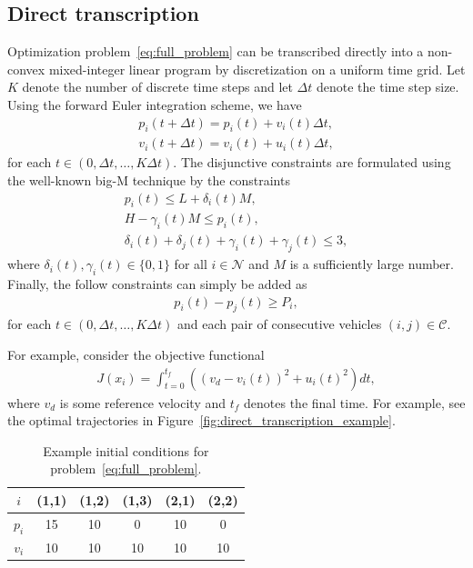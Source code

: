 \documentclass[a4paper]{article}
\theoremstyle{definition}
\theoremstyle{plain}
\begin{document}
\subsection*{Direct transcription}

Optimization problem~\eqref{eq:full_problem} can be transcribed directly into a
non-convex mixed-integer linear program by discretization on a uniform time
grid. Let $K$ denote the number of discrete time steps and let $\Delta t$ denote
the time step size.
%
Using the forward Euler integration scheme, we have
\begin{subequations}
\begin{align*}
  p_{i}(t + \Delta t) = p_{i}(t) + v_{i}(t) \Delta t , \\
  v_{i}(t + \Delta t) = v_{i}(t) + u_{i}(t) \Delta t ,
\end{align*}
\end{subequations}
for each $t \in (0, \Delta t, \dots, K \Delta t)$. The disjunctive constraints are formulated
using the well-known big-M technique by the constraints
\begin{subequations}
\begin{align*}
  p_{i}(t) \leq L + \delta_{i}(t) M , \\
  H - \gamma_{i}(t) M \leq p_{i}(t) , \\
  \delta_{i}(t) + \delta_{j}(t) + \gamma_{i}(t) + \gamma_{j}(t) \leq 3 ,
\end{align*}
\end{subequations}
where $\delta_{i}(t), \gamma_{i}(t) \in \{ 0, 1 \}$ for all $i \in \mathcal{N}$
and $M$ is a sufficiently large number.
%
Finally, the follow constraints can simply be added as
\begin{align*}
  p_{i}(t) - p_{j}(t) \geq P_{i} ,
\end{align*}
for each $t \in (0, \Delta t, \dots, K \Delta t)$ and each pair of consecutive
vehicles $(i, j) \in \mathcal{C}$.

For example, consider the objective functional
\begin{align}\label{eq:example_obj}
  J(x_{i}) = \int_{t=0}^{t_{f}} \left( {(v_{d} - v_{i}(t))}^{2} + {u_{i}(t)}^{2} \right) dt ,
\end{align}
where $v_{d}$ is some reference velocity and $t_{f}$ denotes the final time. For
example, see the optimal trajectories in
Figure~\ref{fig:direct_transcription_example}.

\begin{table}[H]
  \centering
\begin{tabular}{ c | c c c | c c }
  $i$  & (1,1) & (1,2) & (1,3) & (2,1) & (2,2) \\
  \hline
  $p_{i}$ & 15 & 10 &  0 & 10 &  0 \\
  $v_{i}$ & 10 & 10 & 10 & 10 & 10 \\
\end{tabular}
\caption{Example initial conditions for problem~\eqref{eq:full_problem}.}
\label{tab:hult_parameters}
\end{table}
\end{document}
